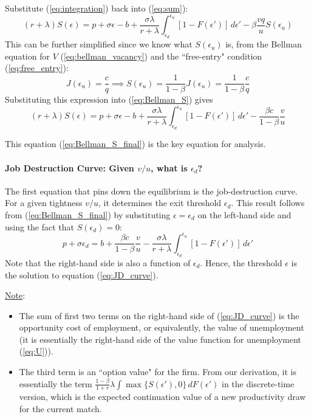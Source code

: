 \documentclass[12pt]{article}
\begin{document}
Substitute (\ref{eq:integration}) back into (\ref{eq:sum}):
\begin{equation} \label{eq:Bellman_S}
	(r+\lambda) S(\epsilon) = p + \sigma \epsilon - b + \frac{\sigma \lambda}{r + \lambda} \int_{\epsilon_d}^{\epsilon_u} [1- F(\epsilon')] \, d\epsilon' - \beta \frac{vq}{u} S(\epsilon_u) 
\end{equation}
This can be further simplified since we know what $S(\epsilon_u)$ is, from the Bellman equation for $V$ (\ref{eq:bellman_vacancy}) and the ``free-entry" condition (\ref{eq:free_entry}):
\[J(\epsilon_u) = \frac{c}{q} \implies S(\epsilon_u) = \frac{1}{1-\beta} J(\epsilon_u) = \frac{1}{1-\beta} \frac{c}{q}\]
Substituting this expression into (\ref{eq:Bellman_S}) gives
\begin{equation} \label{eq:Bellman_S_final}
	(r+\lambda) S(\epsilon) = p + \sigma \epsilon - b + \frac{\sigma \lambda}{r + \lambda} \int_{\epsilon_d}^{\epsilon_u} [1- F(\epsilon')] \, d\epsilon' - \frac{\beta c}{1-\beta} \frac{v}{u}
\end{equation}

This equation (\ref{eq:Bellman_S_final}) is the key equation for analysis.

\paragraph{Job Destruction Curve: Given $v/u$, what is $\epsilon_d$? \\ [6pt]}

The first equation that pins down the equilibrium is the job-destruction curve. For a given tightness $v/u$, it determines the exit threshold $\epsilon_d$. This result follows from (\ref{eq:Bellman_S_final}) by substituting $\epsilon = \epsilon_d$ on the left-hand side and using the fact that $S(\epsilon_d) = 0$:
\begin{equation} \label{eq:JD_curve}
	p + \sigma \epsilon_d = b + \frac{\beta c}{1-\beta} \frac{v}{u} -  \frac{\sigma \lambda}{r + \lambda} \int_{\epsilon_d}^{\epsilon_u} [1- F(\epsilon')] \, d\epsilon'
\end{equation}
Note that the right-hand side is also a function of $\epsilon_d$. Hence, the threshold $\epsilon$ is the solution to equation (\ref{eq:JD_curve}). 

\underline{Note}:
\begin{itemize}
	\item The sum of first two terms on the right-hand side of (\ref{eq:JD_curve}) is the opportunity cost of employment, or equivalently, the value of unemployment (it is essentially the right-hand side of the value function for unemployment (\ref{eq:U})). 
	\item The third term is an ``option value" for the firm. From our derivation, it is essentially the term $\frac{1-\beta}{1+r} \lambda \int \max\{S(\epsilon'), 0\} \, dF(\epsilon')$ in the discrete-time version, which is the expected continuation value of a new productivity draw for the current match.
\end{itemize}
\end{document}
